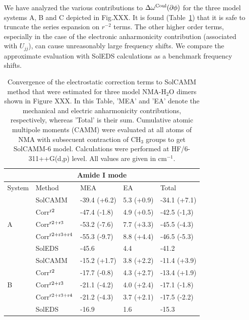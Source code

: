 \documentclass[a4paper,titlepage,twoside,fleqn,12pt]{book}
\begin{document}
\begin{appendices}
We have analyzed the various contributions to $\Delta\omega^{\rm Coul}(\partial\phi)$
for the three model systems A, B and C depicted in Fig.XXX. It is found 
(Table~\ref{t:ctest}) that
it is safe to truncate the series espansion on $r^{-2}$ terms. The other higher order terms,
especially in the case of the electronic anharmonicity contribution 
(associated with $U_{jj}$), can cause unreasonably
large frequency shifts. 
We compare the approximate evaluation with SolEDS calculations as a benchmark frequency shifts.

\begin{table}[ht]
\caption{Convergence of the electrostatic correction terms to SolCAMM
method that were estimated for three model NMA-H$_2$O dimers
shown in Figure XXX. In this Table, 'MEA' and 'EA' denote the mechanical and electric
anharmonicity contributions, respectively, whereas 'Total' is their sum.
Cumulative atomic multipole moments (CAMM) were evaluated 
at all atoms of NMA with subsecuent contraction of CH$_3$ groups 
to get SolCAMM-6 model.
Calculations were performed at HF/6-311++G(d,p) level.
All values are given in cm$^{-1}$.
\label{t:ctest}}
\begin{tabular*}{1.0\textwidth}{@{\extracolsep{\fill} } l ll ll}
\hline\hline
\multicolumn{5}{c}{Amide I mode} \\
\hline
System               & Method    & MEA           & EA         & Total        \\
\hline
\multirow{5}{*}{A}   & SolCAMM   & -39.4 (+6.2)  & 5.3 (+0.9) & -34.1 (+7.1) \\
        & Corr$^{\rm r2}$        & -47.4 (-1.8)  & 4.9 (+0.5) & -42.5 (-1,3) \\
        & Corr$^{\rm r2+r3}$     & -53.2 (-7.6)  & 7.7 (+3.3) & -45.5 (-4.3) \\
        & Corr$^{\rm r2+r3+r4}$  & -55.3 (-9.7)  & 8.8 (+4.4) & -46.5 (-5.3) \\
                     & SolEDS    & -45.6         & 4.4        & -41.2        \\
\hline
\multirow{5}{*}{B}   & SolCAMM   & -15.2 (+1.7)  & 3.8 (+2.2) & -11.4 (+3.9) \\
        & Corr$^{\rm r2}$        & -17.7 (-0.8)  & 4.3 (+2.7) & -13.4 (+1.9) \\
        & Corr$^{\rm r2+r3}$     & -21.1 (-4.2)  & 4.0 (+2.4) & -17.1 (-1.8) \\
        & Corr$^{\rm r2+r3+r4}$  & -21.2 (-4.3)  & 3.7 (+2.1) & -17.5 (-2.2) \\
                     & SolEDS    & -16.9         & 1.6        & -15.3        \\

\end{tabular*}
\end{table}
\end{appendices}
\end{document}
